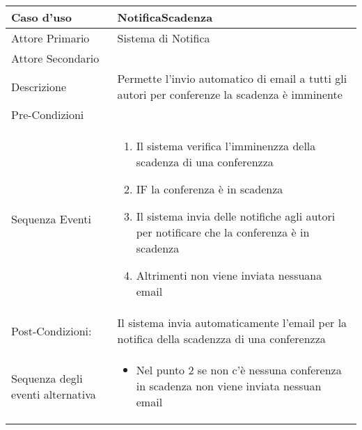 \begin{tabular}{|p{3cm}|p{7cm}|}
\hline 
\rowcolor{Orchid}
Caso d'uso & NotificaScadenza \\
\hline
Attore Primario & Sistema di Notifica\\
\hline
Attore Secondario & \\
\hline
Descrizione & Permette l'invio automatico di email a tutti gli autori per conferenze la scadenza è imminente\\
\hline
Pre-Condizioni& \\
\hline
  Sequenza Eventi&
                   \begin{enumerate}
                   \item Il sistema verifica l'imminenzza della scadenza di una conferenzza
                   \item IF la conferenza è in scadenza
                   \item Il sistema invia delle notifiche agli autori per notificare che la conferenza è in scadenza
                   \item Altrimenti non viene inviata nessuana email
                   \end{enumerate}\\
\hline
Post-Condizioni: & Il sistema invia automaticamente l'email per la notifica della scadenzza di una conferenzza\\
\hline
Sequenza degli eventi alternativa & \begin{itemize}
  \item Nel punto 2 se non c'è nessuna conferenza in scadenza non viene inviata nessuan email
\end{itemize} \\
\hline
\end{tabular}


